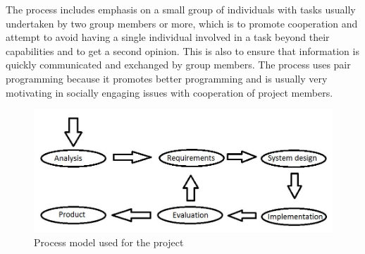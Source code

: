 The process includes emphasis on a small group of individuals with tasks usually undertaken by two group members or more, which is to promote cooperation and attempt to avoid having a single individual involved in a task beyond their capabilities and to get a second opinion. This is also to ensure that information is quickly communicated and exchanged by group members. The process uses pair programming because it promotes better programming and is usually very motivating in socially engaging issues with cooperation of project members.

\begin{figure}[h]
\centering
\includegraphics[scale=0.35]{billeder/process-model}
\caption{Process model used for the project}
\label{pm}
\end{figure}


